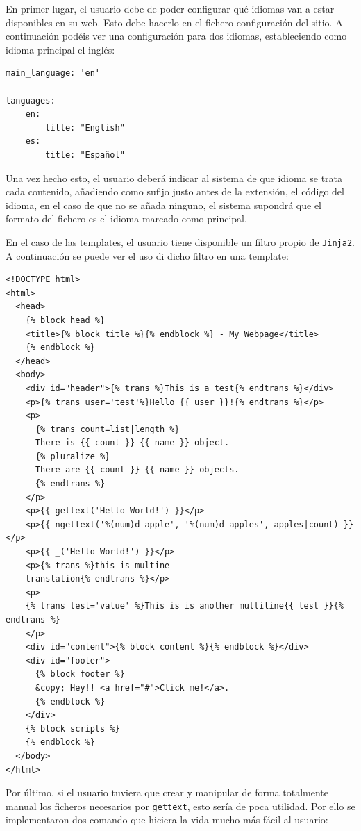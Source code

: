 En primer lugar, el usuario debe de poder configurar qué idiomas van a estar disponibles en su web. Esto debe hacerlo
en el fichero configuración del sitio. A continuación podéis ver una configuración para dos idiomas, estableciendo como
idioma principal el inglés:

\begin{verbatim}
main_language: 'en'

languages:
    en:
		title: "English"
    es:
		title: "Español"
\end{verbatim}

Una vez hecho esto, el usuario deberá indicar al sistema de que idioma se trata cada contenido, añadiendo como sufijo
justo antes de la extensión, el código del idioma, en el caso de que no se añada ninguno, el sistema supondrá que
el formato del fichero es el idioma marcado como principal.

En el caso de las templates, el usuario tiene disponible un filtro propio de \texttt{Jinja2}. A continuación
se puede ver el uso di dicho filtro en una template:

\begin{verbatim}
<!DOCTYPE html>
<html>
  <head>
    {% block head %}
    <title>{% block title %}{% endblock %} - My Webpage</title>
    {% endblock %}
  </head>
  <body>
    <div id="header">{% trans %}This is a test{% endtrans %}</div>
    <p>{% trans user='test'%}Hello {{ user }}!{% endtrans %}</p>
    <p>
      {% trans count=list|length %}
      There is {{ count }} {{ name }} object.
      {% pluralize %}
      There are {{ count }} {{ name }} objects.
      {% endtrans %}
    </p>
    <p>{{ gettext('Hello World!') }}</p>
    <p>{{ ngettext('%(num)d apple', '%(num)d apples', apples|count) }}</p>
    <p>{{ _('Hello World!') }}</p>
    <p>{% trans %}this is multine
    translation{% endtrans %}</p>
    <p>
    {% trans test='value' %}This is is another multiline{{ test }}{% endtrans %}
    </p>
    <div id="content">{% block content %}{% endblock %}</div>
    <div id="footer">
      {% block footer %}
      &copy; Hey!! <a href="#">Click me!</a>.
      {% endblock %}
    </div>
    {% block scripts %}
    {% endblock %}
  </body>
</html>
\end{verbatim}

Por último, si el usuario tuviera que crear y manipular de forma totalmente manual los ficheros
necesarios por \texttt{gettext}, esto sería de poca utilidad. Por ello se implementaron dos comando
que hiciera la vida mucho más fácil al usuario:

